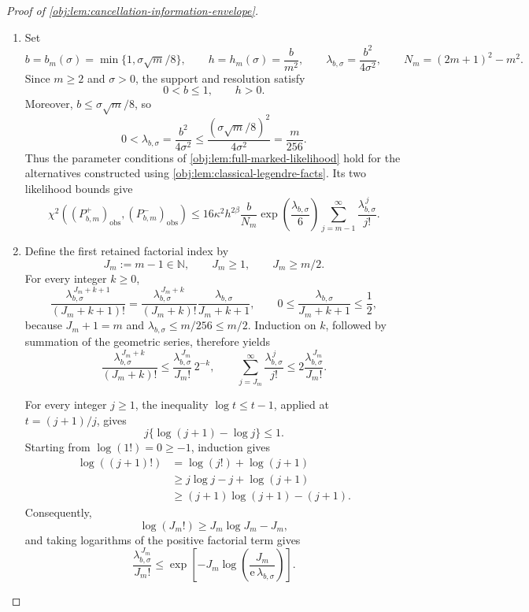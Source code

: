 \documentclass[11pt]{article}
\begin{document}
\begin{proof}[Proof of \cref{obj:lem:cancellation-information-envelope}]
\begin{enumerate}
\item Set
\[
b=b_m(\sigma)=\min\{1,\sigma\sqrt m/8\},
\qquad
h=h_m(\sigma)=\frac{b}{m^2},
\qquad
\lambda_{b,\sigma}=\frac{b^2}{4\sigma^2},
\qquad
N_m=(2m+1)^2-m^2.
\]
Since \(m\ge2\) and \(\sigma>0\), the support and resolution satisfy
\[
0<b\le1,\qquad h>0.
\]
Moreover, \(b\le\sigma\sqrt m/8\), so
\[
0<\lambda_{b,\sigma}
=\frac{b^2}{4\sigma^2}
\le
\frac{(\sigma\sqrt m/8)^2}{4\sigma^2}
=\frac{m}{256}.
\]
Thus the parameter conditions of \cref{obj:lem:full-marked-likelihood} hold for the alternatives constructed using \cref{obj:lem:classical-legendre-facts}. Its two likelihood bounds give
\[
\chi^2\!\left((P^+_{b,m})_{\mathrm{obs}},
             (P^-_{b,m})_{\mathrm{obs}}\right)
\le
16\kappa^2h^{2\beta}\frac{b}{N_m}
\exp\!\left(\frac{\lambda_{b,\sigma}}6\right)
\sum_{j=m-1}^{\infty}\frac{\lambda_{b,\sigma}^{\,j}}{j!}.
\]

\item Define the first retained factorial index by
\[
J_m:=m-1\in\mathbb N,
\qquad J_m\ge1,\qquad J_m\ge m/2.
\]
For every integer \(k\ge0\),
\[
\frac{\lambda_{b,\sigma}^{\,J_m+k+1}}{(J_m+k+1)!}
=
\frac{\lambda_{b,\sigma}^{\,J_m+k}}{(J_m+k)!}
\frac{\lambda_{b,\sigma}}{J_m+k+1},
\qquad
0\le\frac{\lambda_{b,\sigma}}{J_m+k+1}
\le\frac12,
\]
because \(J_m+1=m\) and \(\lambda_{b,\sigma}\le m/256\le m/2\).
Induction on \(k\), followed by summation of the geometric series, therefore yields
\[
\frac{\lambda_{b,\sigma}^{\,J_m+k}}{(J_m+k)!}
\le
\frac{\lambda_{b,\sigma}^{\,J_m}}{J_m!}\,2^{-k},
\qquad
\sum_{j=J_m}^{\infty}\frac{\lambda_{b,\sigma}^{\,j}}{j!}
\le
2\frac{\lambda_{b,\sigma}^{\,J_m}}{J_m!}.
\]

For every integer \(j\ge1\), the inequality
\(\log t\le t-1\), applied at \(t=(j+1)/j\), gives
\[
j\{\log(j+1)-\log j\}\le1.
\]
Starting from \(\log(1!)=0\ge-1\), induction gives
\[
\begin{aligned}
\log((j+1)!)
&=\log(j!)+\log(j+1)\\
&\ge j\log j-j+\log(j+1)\\
&\ge (j+1)\log(j+1)-(j+1).
\end{aligned}
\]
Consequently,
\[
\log(J_m!)\ge J_m\log J_m-J_m,
\]
and taking logarithms of the positive factorial term gives
\[
\frac{\lambda_{b,\sigma}^{\,J_m}}{J_m!}
\le
\exp\!\left[
-J_m\log\!\left(\frac{J_m}{\mathrm e\,\lambda_{b,\sigma}}\right)
\right].
\]


\end{enumerate}
\end{proof}
\end{document}
